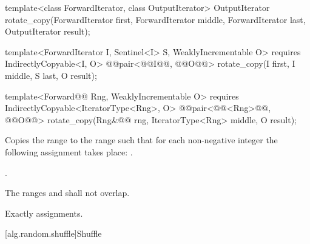 %
\begin{removedblock}
\begin{itemdecl}
template<class ForwardIterator, class OutputIterator>
  OutputIterator
    rotate_copy(ForwardIterator first, ForwardIterator middle,
                ForwardIterator last, OutputIterator result);
\end{itemdecl}
\end{removedblock}
\begin{addedblock}
\begin{itemdecl}
template<ForwardIterator I, Sentinel<I> S, WeaklyIncrementable O>
  requires IndirectlyCopyable<I, O>
  @@pair<@@I@\newtxt{)}@, @@O@\newtxt{)}@>
    rotate_copy(I first, I middle, S last, O result);

template<Forward@@ Rng, WeaklyIncrementable O>
  requires IndirectlyCopyable<IteratorType<Rng>, O>
  @@pair<@@<Rng>@\newtxt{)}@, @@O@\newtxt{)}@>
    rotate_copy(Rng&@\newtxt{\&}@ rng, IteratorType<Rng> middle, O result);
\end{itemdecl}
\end{addedblock}

\begin{itemdescr}
\pnum
\effects
Copies the range
to the range
such that for each non-negative integer
the following assignment takes place:
.

\pnum
\returns
{}.

\pnum
\requires
The ranges
and
shall not overlap.

\pnum
\complexity
Exactly
assignments.
\end{itemdescr}

[alg.random.shuffle]{Shuffle}

